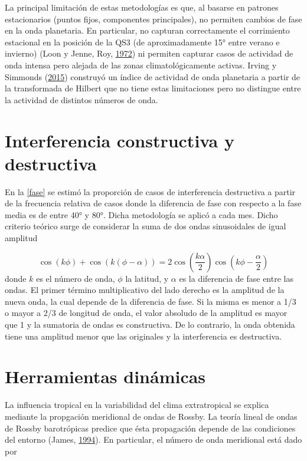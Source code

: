 \documentclass[spanish,a4paper,12pt,oneside]{book}
\begin{document}
La principal limitación de estas metodologías es que, al basarse en
patrones estacionarios (puntos fijos, componentes principales), no
permiten cambios de fase en la onda planetaria. En particular, no
capturan correctamente el corrimiento estacional en la posición de la
QS3 (de aproximadamente 15° entre verano e invierno) (Loon y Jenne, Roy,
\protect\hyperlink{ref-Loon1972}{1972}) ni permiten capturar casos de
actividad de onda intensa pero alejada de las zonas climatológicamente
activas. Irving y Simmonds (\protect\hyperlink{ref-Irving2015}{2015})
construyó un índice de actividad de onda planetaria a partir de la
transformada de Hilbert que no tiene estas limitaciones pero no
distingue entre la actividad de distintos números de onda.

\section*{Interferencia constructiva y destructiva}

En la \autoref{fase} se estimó la proporción de casos de interferencia
destructiva a partir de la frecuencia relativa de casos donde la
diferencia de fase con respecto a la fase media es de entre 40° y 80°.
Dicha metodología se aplicó a cada mes. Dicho criterio teórico surge de
considerar la suma de dos ondas sinusoidales de igual amplitud

\[
\cos\left (k\phi \right) + \cos(k(\phi - \alpha)) = 2\cos\left( \frac{k\alpha}{2} \right)\cos\left( k\phi - \frac{\alpha}{2}\right) 
\] donde \(k\) es el número de onda, \(\phi\) la latitud, y \(\alpha\)
es la diferencia de fase entre las ondas. El primer término
multiplicativo del lado derecho es la amplitud de la nueva onda, la cual
depende de la diferencia de fase. Si la misma es menor a 1/3 o mayor a
2/3 de longitud de onda, el valor absoludo de la amplitud es mayor que 1
y la sumatoria de ondas es constructiva. De lo contrario, la onda
obtenida tiene una amplitud menor que las originales y la interferencia
es destructiva.

\section*{Herramientas dinámicas}

La influencia tropical en la variabilidad del clima extratropical se
explica mediante la propgación meridional de ondas de Rossby. La teoría
lineal de ondas de Rossby barotrópicas predice que ésta propagación
depende de las condiciones del entorno (James,
\protect\hyperlink{ref-James}{1994}). En particular, el número de onda
meridional está dado por
\end{document}
